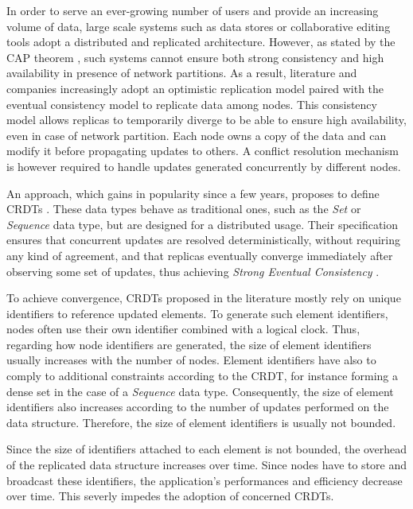 \documentclass[sigplan]{acmart}
\begin{document}
In order to serve an ever-growing number of users and provide an increasing volume of data,
large scale systems such as data stores or collaborative editing tools adopt a distributed and replicated architecture.
However, as stated by the CAP theorem \cite{brewer_2000_podc}, such systems cannot ensure both strong consistency and high availability in presence of network partitions.
As a result, literature and companies increasingly adopt an optimistic replication model \cite{saito_2005_optimistic-replication} paired with the eventual consistency model to replicate data among nodes.
This consistency model allows replicas to temporarily diverge to be able to ensure high availability, even in case of network partition.
Each node owns a copy of the data and can modify it before propagating updates to others.
A conflict resolution mechanism is however required to handle updates generated concurrently by different nodes.

An approach, which gains in popularity since a few years, proposes to define \acfp{CRDT} \cite{shapiro_2011_crdt}.
These data types behave as traditional ones, such as the \emph{Set} or \emph{Sequence} data type, but are designed for a distributed usage.
Their specification ensures that concurrent updates are resolved deterministically, without requiring any kind of agreement, and that replicas eventually converge immediately after observing some set of updates,
thus achieving \emph{Strong Eventual Consistency} \cite{shapiro_2011_crdt}.

To achieve convergence, \acp{CRDT} proposed in the literature mostly rely on unique identifiers to reference updated elements.
To generate such element identifiers, nodes often use their own identifier combined with a logical clock.
Thus, regarding how node identifiers are generated, the size of element identifiers usually increases with the number of nodes.
Element identifiers have also to comply to additional constraints according to the \ac{CRDT}, for instance forming a dense set in the case of a \emph{Sequence} data type.
Consequently, the size of element identifiers also increases according to the number of updates performed on the data structure.
Therefore, the size of element identifiers is usually not bounded.

Since the size of identifiers attached to each element is not bounded, the overhead of the replicated data structure increases over time.
Since nodes have to store and broadcast these identifiers, the application's performances and efficiency decrease over time.
This severly impedes the adoption of concerned \acp{CRDT}.
\end{document}
